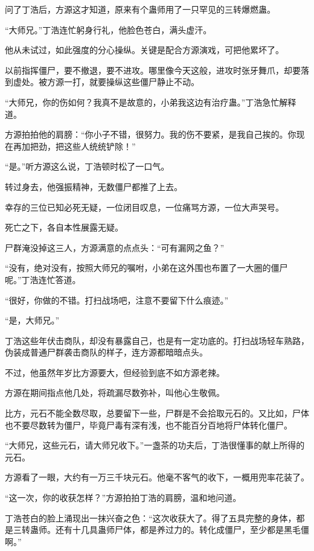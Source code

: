 \begin{this_body}
问了丁浩后，方源这才知道，原来有个蛊师用了一只罕见的三转爆燃蛊。

“大师兄。”丁浩连忙躬身行礼，他脸色苍白，满头虚汗。

他从未试过，如此强度的分心操纵。关键是配合方源演戏，可把他累坏了。

以前指挥僵尸，要不撤退，要不进攻。哪里像今天这般，进攻时张牙舞爪，却要落到虚处。被方源一打，就要操纵这些僵尸静止不动。

“大师兄，你的伤如何？我真不是故意的，小弟我这边有治疗蛊。”丁浩急忙解释道。

方源拍拍他的肩膀：“你小子不错，很努力。我的伤不要紧，是我自己挨的。你现在再加把劲，把这些人统统铲除！”

“是。”听方源这么说，丁浩顿时松了一口气。

转过身去，他强振精神，无数僵尸都推了上去。

幸存的三位已知必死无疑，一位闭目叹息，一位痛骂方源，一位大声哭号。

死亡之下，各自本性展露无疑。

尸群淹没掉这三人，方源满意的点点头：“可有漏网之鱼？”

“没有，绝对没有，按照大师兄的嘱咐，小弟在这外围也布置了一大圈的僵尸呢。”丁浩连忙答道。

“很好，你做的不错。打扫战场吧，注意不要留下什么痕迹。”

“是，大师兄。”

丁浩这些年伏击商队，却没有暴露自己，也是有一定功底的。打扫战场轻车熟路，伪装成普通尸群袭击商队的样子，连方源都暗暗点头。

不过，他虽然年岁比方源要大，但经验到底不如方源老辣。

方源在期间指点他几处，将疏漏尽数弥补，叫他心生敬佩。

比方，元石不能全数尽取，总要留下一些，尸群是不会拾取元石的。又比如，尸体也不要尽数转为僵尸，毕竟尸毒有深有浅，也不能百分百地将尸体转化僵尸。

“大师兄，这些元石，请大师兄收下。”一盏茶的功夫后，丁浩很懂事的献上所得的元石。

方源看了一眼，大约有一万三千块元石。他毫不客气的收下，一概用兜率花装了。

“这一次，你的收获怎样？”方源拍拍丁浩的肩膀，温和地问道。

丁浩苍白的脸上涌现出一抹兴奋之色：“这次收获大了。得了五具完整的身体，都是三转蛊师。还有十几具蛊师尸体，都是养过力的。转化成僵尸，至少都是黑毛僵啊。”


\end{this_body}
